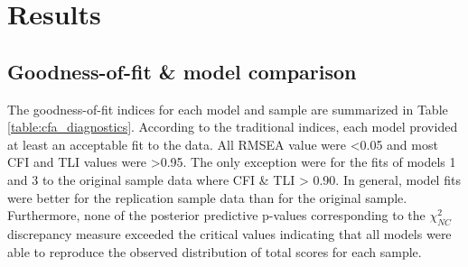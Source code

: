 \documentclass[letterpaper,man,natbib,noextraspace,floatsintext,longtable,12pt]{apa6}
\begin{document}
\section{Results}

\subsection{Goodness-of-fit \& model comparison}

The goodness-of-fit indices for each model and sample are summarized in Table \ref{table:cfa_diagnostics}. According to the traditional indices, each model provided at least an acceptable fit to the data. All RMSEA value were <0.05 and most CFI and TLI values were >0.95. The only exception were for the fits of models 1 and 3 to the original sample data where CFI \& TLI > 0.90. In general, model fits were better for the replication sample data than for the original sample. Furthermore, none of the posterior predictive p-values corresponding to the $\chi^2_{NC}$ discrepancy measure exceeded the critical values indicating that all models were able to reproduce the observed distribution of total scores for each sample.
\end{document}
